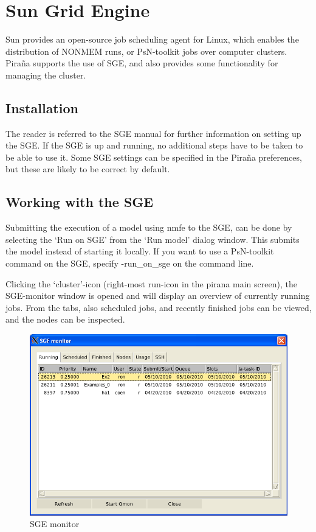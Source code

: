 \documentclass[a4,11pt]{report} \usepackage[pdftex]{graphicx}
\begin{document}
{{\section{Sun Grid Engine}

Sun provides an open-source job scheduling agent for Linux, which
enables the distribution of NONMEM runs, or PsN-toolkit jobs over
computer clusters. Pira\~na supports the use of SGE, and also provides
some functionality for managing the cluster.

\subsection{Installation}
The reader is referred to the SGE manual for further information on
setting up the SGE. If the SGE is up and running, no additional steps
have to be taken to be able to use it. Some SGE settings can be
specified in the Pira\~na preferences, but these are likely to be
correct by default.

\subsection{Working with the SGE}
Submitting the execution of a model using nmfe to the SGE, can be done
by selecting the `Run on SGE' from the `Run model' dialog window. This
submits the model instead of starting it locally. If you want to use a
PsN-toolkit command on the SGE, specify -run\_on\_sge on the command
line.

Clicking the `cluster'-icon (right-most run-icon in the pirana main
screen), the SGE-monitor window is opened and will display an overview
of currently running jobs. From the tabs, also scheduled jobs, and
recently finished jobs can be viewed, and the nodes can be inspected.

\begin{figure}[hbt] \centering
    \includegraphics[scale=0.5]{images/sge_monitor.png}
    \caption{SGE monitor}
\end{figure}


}}
\end{document}
